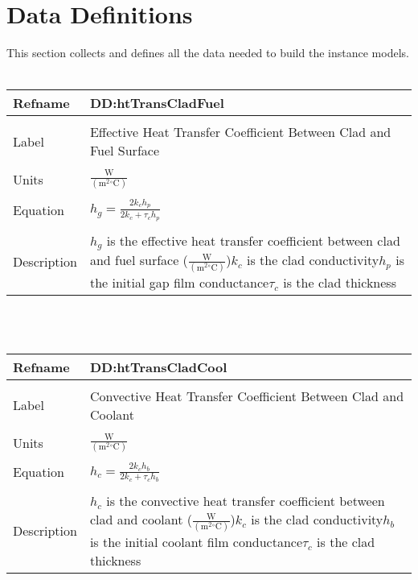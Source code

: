 \documentclass[12pt]{article}
\begin{document}
\section{Data Definitions}
\label{Sec:DDs}
This section collects and defines all the data needed to build the instance models.
~\newline
\noindent \begin{minipage}{\textwidth}
\begin{tabular}{p{} p{}}
\toprule \textbf{Refname} & \textbf{DD:htTransCladFuel}
\label{DD:htTransCladFuel}
\\ \midrule \\
Label & Effective Heat Transfer Coefficient Between Clad and Fuel Surface
\\ \midrule \\
Units & $\frac{\text{W}}{(\text{m}^{2}{}^{\circ}\text{C})}$
\\ \midrule \\
Equation & ${h_{g}}=\frac{2 {k_{c}} {h_{p}}}{2 {k_{c}}+{τ_{c}} {h_{p}}}$
\\ \midrule \\
Description & ${h_{g}}$ is the effective heat transfer coefficient between clad and fuel surface ($\frac{\text{W}}{(\text{m}^{2}{}^{\circ}\text{C})}$)\newline${k_{c}}$ is the clad conductivity\newline${h_{p}}$ is the initial gap film conductance\newline${τ_{c}}$ is the clad thickness
\\ \bottomrule \end{tabular}
\end{minipage}\\
~\newline
\noindent \begin{minipage}{\textwidth}
\begin{tabular}{p{} p{}}
\toprule \textbf{Refname} & \textbf{DD:htTransCladCool}
\label{DD:htTransCladCool}
\\ \midrule \\
Label & Convective Heat Transfer Coefficient Between Clad and Coolant
\\ \midrule \\
Units & $\frac{\text{W}}{(\text{m}^{2}{}^{\circ}\text{C})}$
\\ \midrule \\
Equation & ${h_{c}}=\frac{2 {k_{c}} {h_{b}}}{2 {k_{c}}+{τ_{c}} {h_{b}}}$
\\ \midrule \\
Description & ${h_{c}}$ is the convective heat transfer coefficient between clad and coolant ($\frac{\text{W}}{(\text{m}^{2}{}^{\circ}\text{C})}$)\newline${k_{c}}$ is the clad conductivity\newline${h_{b}}$ is the initial coolant film conductance\newline${τ_{c}}$ is the clad thickness
\\ \bottomrule \end{tabular}
\end{minipage}\\
\end{document}
